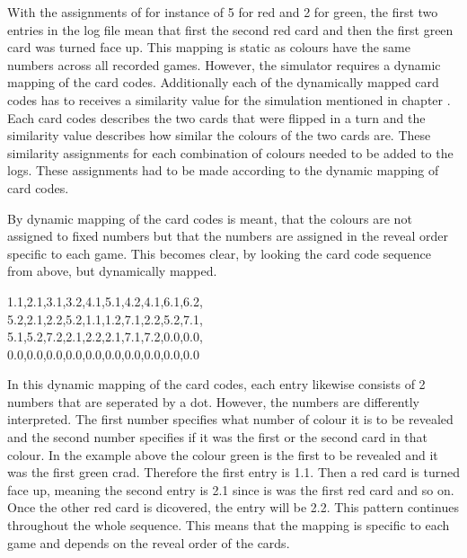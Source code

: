  With the assignments of for instance of 5 for red and 2 for green, the first two entries in the log file mean that first the second red card and then the first green card was turned face up. This mapping is static as colours have the same numbers across all recorded games. However, the simulator requires a dynamic mapping of the card codes. Additionally each of the dynamically mapped card codes has to receives a similarity value for the simulation mentioned in chapter . Each card codes describes the two cards that were flipped in a turn and the similarity value describes how similar the colours of the two cards are. These similarity assignments for each combination of colours needed to be added to the logs. These assignments had to be made according to the dynamic mapping of card codes. 

By dynamic mapping of the card codes is meant, that the colours are not assigned to fixed numbers but that the numbers are assigned in the reveal order specific to each game. This becomes clear, by looking the card code sequence from above, but dynamically mapped.
\begin{center}
	1.1,2.1,3.1,3.2,4.1,5.1,4.2,4.1,6.1,6.2,\\
	5.2,2.1,2.2,5.2,1.1,1.2,7.1,2.2,5.2,7.1,\\
	5.1,5.2,7.2,2.1,2.2,2.1,7.1,7.2,0.0,0.0,\\
	0.0,0.0,0.0,0.0,0.0,0.0,0.0,0.0,0.0,0.0
\end{center}

 In this dynamic mapping of the card codes, each entry likewise consists of 2 numbers that are seperated by a dot. However, the numbers are differently interpreted. The first number specifies what number of colour it is to be revealed and the second number specifies if it was the first or the second card in that colour. In the example above the colour green is the first to be revealed and it was the first green crad. Therefore the first entry is 1.1. Then a red card is turned face up, meaning the second entry is 2.1 since is was the first red card and so on. Once the other red card is dicovered, the entry will be 2.2. This pattern continues throughout the whole sequence. This means that the mapping is specific to each game and depends on the reveal order of the cards. 

